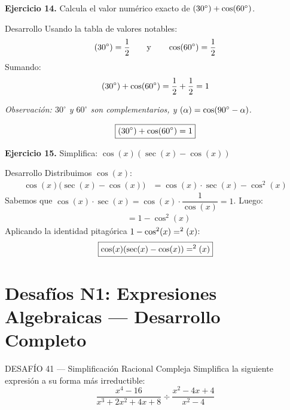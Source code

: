 \documentclass[letterpaper, 12pt]{article}
\let\sin\relax
\DeclareMathOperator{\sin}{sen}
\begin{document}
\vspace{0.4cm}

\textbf{Ejercicio 14.} Calcula el valor numérico exacto de $\sin(30^\circ) + \cos(60^\circ)$.

\begin{solucionbox}{Desarrollo}
Usando la tabla de valores notables:
\[
    \sin(30^\circ) = \frac{1}{2} \qquad \text{y} \qquad \cos(60^\circ) = \frac{1}{2}
\]
Sumando:
\[
    \sin(30^\circ) + \cos(60^\circ) = \frac{1}{2} + \frac{1}{2} = 1
\]

\textit{Observación: $30^\circ$ y $60^\circ$ son complementarios, y $\sin(\alpha) = \cos(90^\circ - \alpha)$.}

\[\boxed{\sin(30^\circ) + \cos(60^\circ) = 1}\]
\end{solucionbox}

\vspace{0.4cm}

\textbf{Ejercicio 15.} Simplifica: $\cos(x)(\sec(x) - \cos(x))$

\begin{solucionbox}{Desarrollo}
Distribuimos $\cos(x)$:
\begin{align*}
    \cos(x)\bigl(\sec(x) - \cos(x)\bigr) &= \cos(x) \cdot \sec(x) - \cos^2(x)
\end{align*}
Sabemos que $\cos(x) \cdot \sec(x) = \cos(x) \cdot \dfrac{1}{\cos(x)} = 1$. Luego:
\begin{align*}
    &= 1 - \cos^2(x)
\end{align*}
Aplicando la identidad pitagórica $1 - \cos^2(x) = \sin^2(x)$:
\[\boxed{\cos(x)(\sec(x) - \cos(x)) = \sin^2(x)}\]
\end{solucionbox}

\newpage

\section*{Desafíos N1: Expresiones Algebraicas — Desarrollo Completo}

\begin{desafiobox}{DESAFÍO 41 — Simplificación Racional Compleja}
Simplifica la siguiente expresión a su forma más irreductible:
\[
    \frac{x^4 - 16}{x^3 + 2x^2 + 4x + 8} \div \frac{x^2 - 4x + 4}{x^2 - 4}
\]
\end{desafiobox}
\end{document}
